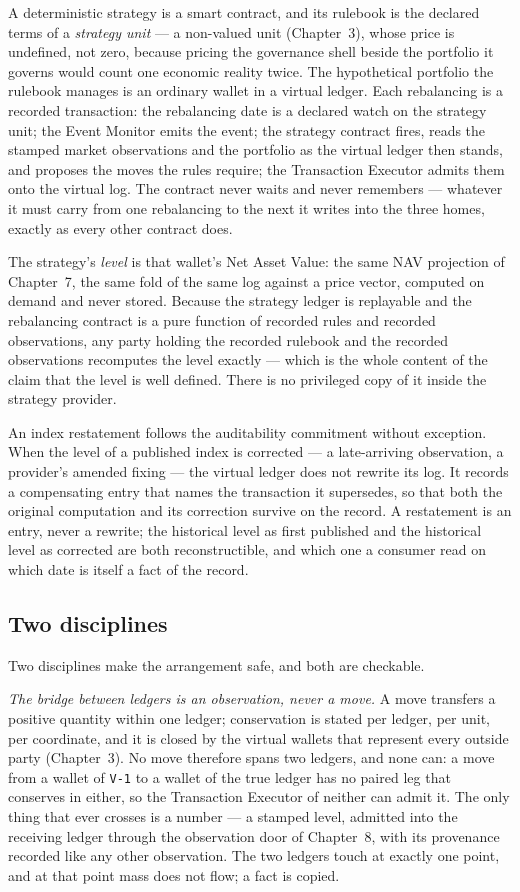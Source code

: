 A deterministic strategy is a smart contract, and its rulebook is the declared
terms of a \emph{strategy unit} --- a non-valued unit (Chapter~3), whose price is
undefined, not zero, because pricing the governance shell beside the portfolio it
governs would count one economic reality twice. The hypothetical portfolio the
rulebook manages is an ordinary wallet in a virtual ledger. Each rebalancing is a
recorded transaction: the rebalancing date is a declared watch on the strategy
unit; the Event Monitor emits the event; the strategy contract fires, reads the
stamped market observations and the portfolio as the virtual ledger then stands,
and proposes the moves the rules require; the Transaction Executor admits them
onto the virtual log. The contract never waits and never remembers --- whatever
it must carry from one rebalancing to the next it writes into the three homes,
exactly as every other contract does.

The strategy's \emph{level} is that wallet's Net Asset Value: the same NAV
projection of Chapter~7, the same fold of the same log against a price vector,
computed on demand and never stored. Because the strategy ledger is replayable
and the rebalancing contract is a pure function of recorded rules and recorded
observations, any party holding the recorded rulebook and the recorded
observations recomputes the level exactly --- which is the whole content of the
claim that the level is well defined. There is no privileged copy of it inside
the strategy provider.

An index restatement follows the auditability commitment without exception. When
the level of a published index is corrected --- a late-arriving observation, a
provider's amended fixing --- the virtual ledger does not rewrite its log. It
records a compensating entry that names the transaction it supersedes, so that
both the original computation and its correction survive on the record. A
restatement is an entry, never a rewrite; the historical level as first published
and the historical level as corrected are both reconstructible, and which one a
consumer read on which date is itself a fact of the record.

\subsection{Two disciplines}

Two disciplines make the arrangement safe, and both are checkable.

\emph{The bridge between ledgers is an observation, never a move.} A move
transfers a positive quantity within one ledger; conservation is stated per
ledger, per unit, per coordinate, and it is closed by the virtual wallets that
represent every outside party (Chapter~3). No move therefore spans two ledgers,
and none can: a move from a wallet of \texttt{V-1} to a wallet of the true ledger
has no paired leg that conserves in either, so the Transaction Executor of
neither can admit it. The only thing that ever crosses is a number --- a stamped
level, admitted into the receiving ledger through the observation door of
Chapter~8, with its provenance recorded like any other observation. The two
ledgers touch at exactly one point, and at that point mass does not flow; a fact
is copied.


